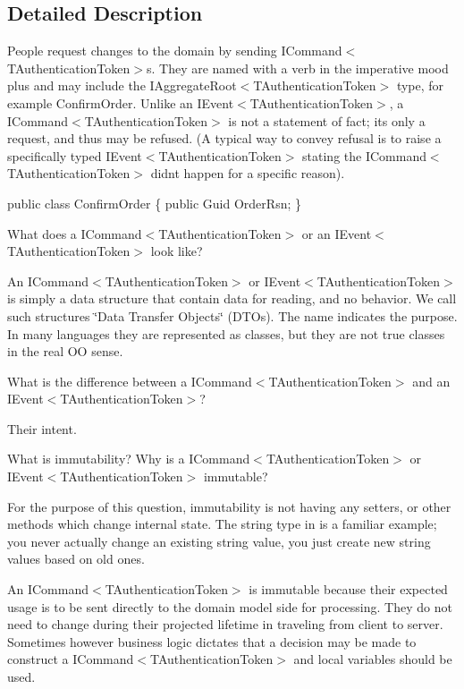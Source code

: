 \subsection{Detailed Description}
People request changes to the domain by sending I\+Command$<$\+T\+Authentication\+Token$>$s. They are named with a verb in the imperative mood plus and may include the I\+Aggregate\+Root$<$\+T\+Authentication\+Token$>$ type, for example Confirm\+Order. Unlike an I\+Event$<$\+T\+Authentication\+Token$>$, a I\+Command$<$\+T\+Authentication\+Token$>$ is not a statement of fact; it\textquotesingle{}s only a request, and thus may be refused. (A typical way to convey refusal is to raise a specifically typed I\+Event$<$\+T\+Authentication\+Token$>$ stating the I\+Command$<$\+T\+Authentication\+Token$>$ didn\textquotesingle{}t happen for a specific reason). 

public class Confirm\+Order \{ public Guid Order\+Rsn; \} 

What does a I\+Command$<$\+T\+Authentication\+Token$>$ or an I\+Event$<$\+T\+Authentication\+Token$>$ look like?

An I\+Command$<$\+T\+Authentication\+Token$>$ or I\+Event$<$\+T\+Authentication\+Token$>$ is simply a data structure that contain data for reading, and no behavior. We call such structures \char`\"{}\+Data Transfer Objects\char`\"{} (D\+T\+Os). The name indicates the purpose. In many languages they are represented as classes, but they are not true classes in the real OO sense.

What is the difference between a I\+Command$<$\+T\+Authentication\+Token$>$ and an I\+Event$<$\+T\+Authentication\+Token$>$?

Their intent.

What is immutability? Why is a I\+Command$<$\+T\+Authentication\+Token$>$ or I\+Event$<$\+T\+Authentication\+Token$>$ immutable?

For the purpose of this question, immutability is not having any setters, or other methods which change internal state. The string type in is a familiar example; you never actually change an existing string value, you just create new string values based on old ones.

An I\+Command$<$\+T\+Authentication\+Token$>$ is immutable because their expected usage is to be sent directly to the domain model side for processing. They do not need to change during their projected lifetime in traveling from client to server. Sometimes however business logic dictates that a decision may be made to construct a I\+Command$<$\+T\+Authentication\+Token$>$ and local variables should be used.

